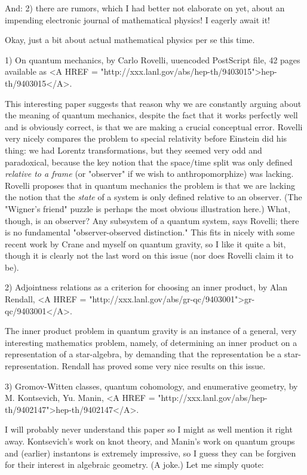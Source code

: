 And: 2) there are rumors, which I had better not elaborate on yet, about
an impending electronic journal of mathematical physics!  I eagerly
await it!

Okay, just a bit about actual mathematical physics per se this time.  

1) On quantum mechanics, by Carlo Rovelli, uuencoded PostScript file, 42
pages available as <A HREF = "http://xxx.lanl.gov/abs/hep-th/9403015">hep-th/9403015</A>.  

This interesting paper suggests that reason why we are constantly
arguing about the meaning of quantum mechanics, despite the fact that it
works perfectly well and is obviously correct, is that we are making a
crucial conceptual error.  Rovelli very nicely compares the problem to
special relativity before Einstein did his thing: we had Lorentz
transformations, but they seemed very odd and paradoxical, because the
key notion that the space/time split was only defined \emph{relative to a frame}
(or "observer" if we wish to anthropomorphize) was lacking.  Rovelli
proposes that in quantum mechanics the problem is that we are lacking
the notion that the \emph{state} of a system is only defined relative to an
observer.  (The "Wigner's friend" puzzle is perhaps the most obvious
illustration here.)  What, though, is an observer?  Any subsystem of a
quantum system, says Rovelli; there is no fundamental "observer-observed
distinction."  This fits in nicely with some recent work by Crane and
myself on quantum gravity, so I like it quite a bit, though it is
clearly not the last word on this issue (nor does Rovelli claim it to
be).  

2) Adjointness relations as a criterion for choosing an inner product,
by Alan Rendall, <A HREF = "http://xxx.lanl.gov/abs/gr-qc/9403001">gr-qc/9403001</A>.  

The inner product problem in quantum gravity is an instance of a
general, very interesting mathematics problem, namely, of determining an
inner product on a representation of a star-algebra, by demanding that
the representation be a star-representation.  Rendall has proved some
very nice results on this issue.

3) Gromov-Witten classes, quantum cohomology, and enumerative geometry,
by M. Kontsevich, Yu. Manin, <A HREF = "http://xxx.lanl.gov/abs/hep-th/9402147">hep-th/9402147</A>.

I will probably never understand this paper so I might as well mention
it right away.  Kontsevich's work on knot theory, and Manin's work on
quantum groups and (earlier) instantons is extremely impressive, so I
guess they can be forgiven for their interest in algebraic geometry.  
(A joke.)  Let me simply quote:

